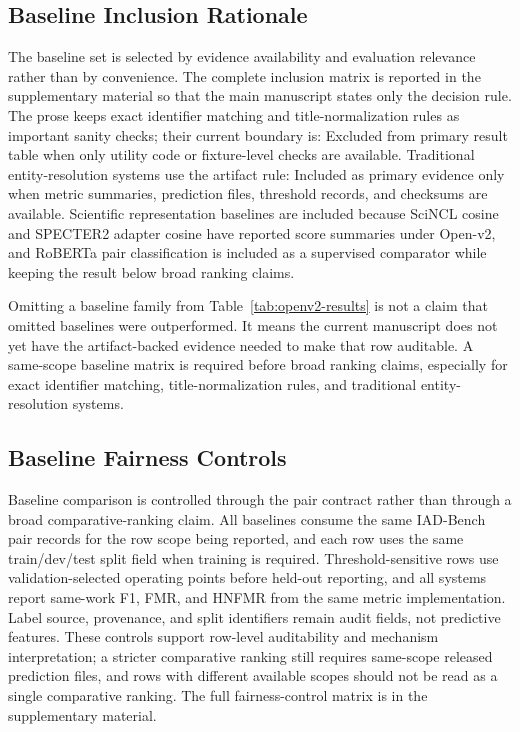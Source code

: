 \documentclass[11pt]{article}
\begin{document}
\subsection{Baseline Inclusion Rationale}

The baseline set is selected by evidence availability and evaluation relevance rather than by convenience. The complete inclusion matrix is reported in the supplementary material so that the main manuscript states only the decision rule. The prose keeps exact identifier matching and title-normalization rules as important sanity checks; their current boundary is: Excluded from primary result table when only utility code or fixture-level checks are available. Traditional entity-resolution systems use the artifact rule: Included as primary evidence only when metric summaries, prediction files, threshold records, and checksums are available. Scientific representation baselines are included because SciNCL cosine and SPECTER2 adapter cosine have reported score summaries under Open-v2, and RoBERTa pair classification is included as a supervised comparator while keeping the result below broad ranking claims.

Omitting a baseline family from Table~\ref{tab:openv2-results} is not a claim that omitted baselines were outperformed. It means the current manuscript does not yet have the artifact-backed evidence needed to make that row auditable. A same-scope baseline matrix is required before broad ranking claims, especially for exact identifier matching, title-normalization rules, and traditional entity-resolution systems.

\subsection{Baseline Fairness Controls}

Baseline comparison is controlled through the pair contract rather than through a broad comparative-ranking claim. All baselines consume the same IAD-Bench pair records for the row scope being reported, and each row uses the same train/dev/test split field when training is required. Threshold-sensitive rows use validation-selected operating points before held-out reporting, and all systems report same-work F1, FMR, and HNFMR from the same metric implementation. Label source, provenance, and split identifiers remain audit fields, not predictive features. These controls support row-level auditability and mechanism interpretation; a stricter comparative ranking still requires same-scope released prediction files, and rows with different available scopes should not be read as a single comparative ranking. The full fairness-control matrix is in the supplementary material.
\end{document}
